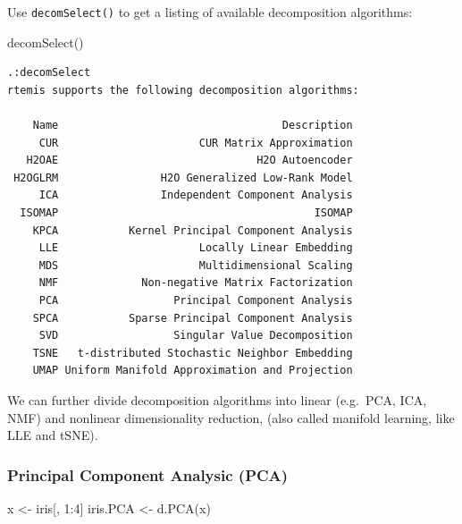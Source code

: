 \documentclass[
]{book}
\newenvironment{Shaded}{\begin{snugshade}}{\end{snugshade}}
\newcommand{\AttributeTok}[1]{\textcolor[rgb]{0.77,0.63,0.00}{#1}}
\newcommand{\DecValTok}[1]{\textcolor[rgb]{0.00,0.00,0.81}{#1}}
\newcommand{\FunctionTok}[1]{\textcolor[rgb]{0.00,0.00,0.00}{#1}}
\newcommand{\NormalTok}[1]{#1}
\newcommand{\OtherTok}[1]{\textcolor[rgb]{0.56,0.35,0.01}{#1}}
\newcommand{\SpecialCharTok}[1]{\textcolor[rgb]{0.00,0.00,0.00}{#1}}
\newcommand{\StringTok}[1]{\textcolor[rgb]{0.31,0.60,0.02}{#1}}
\begin{document}
Use \texttt{decomSelect()} to get a listing of available decomposition algorithms:

\begin{Shaded}
\begin{Highlighting}[]
\FunctionTok{decomSelect}\NormalTok{()}
\end{Highlighting}
\end{Shaded}

\begin{verbatim}
.:decomSelect
rtemis supports the following decomposition algorithms:

    Name                                   Description
     CUR                      CUR Matrix Approximation
   H2OAE                               H2O Autoencoder
 H2OGLRM                H2O Generalized Low-Rank Model
     ICA                Independent Component Analysis
  ISOMAP                                        ISOMAP
    KPCA           Kernel Principal Component Analysis
     LLE                      Locally Linear Embedding
     MDS                      Multidimensional Scaling
     NMF             Non-negative Matrix Factorization
     PCA                  Principal Component Analysis
    SPCA           Sparse Principal Component Analysis
     SVD                  Singular Value Decomposition
    TSNE   t-distributed Stochastic Neighbor Embedding
    UMAP Uniform Manifold Approximation and Projection
\end{verbatim}

We can further divide decomposition algorithms into linear (e.g.~PCA, ICA, NMF) and nonlinear dimensionality reduction, (also called manifold learning, like LLE and tSNE).

\hypertarget{principal-component-analysic-pca}{%
\subsubsection{Principal Component Analysic (PCA)}\label{principal-component-analysic-pca}}

\begin{Shaded}
\begin{Highlighting}[]
\NormalTok{x }\OtherTok{\textless{}{-}}\NormalTok{ iris[, }\DecValTok{1}\SpecialCharTok{:}\DecValTok{4}\NormalTok{]}
\NormalTok{iris.PCA }\OtherTok{\textless{}{-}} \FunctionTok{d.PCA}\NormalTok{(x)}
\end{Highlighting}
\end{Shaded}

\begin{Shaded}
\end{Shaded}
\end{document}
